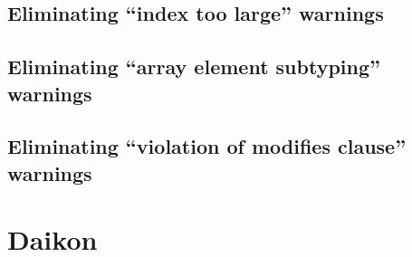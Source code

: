 \documentclass{article}
\begin{document}
\subsection{Eliminating ``index too large'' warnings}

\subsection{Eliminating ``array element subtyping'' warnings}

\subsection{Eliminating ``violation of modifies clause'' warnings}

\section{Daikon}
\end{document}

